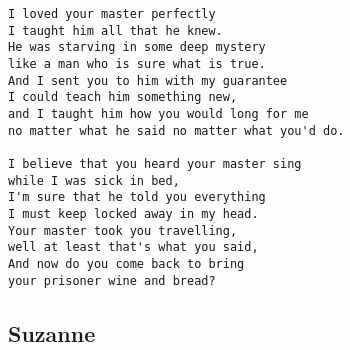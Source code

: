 \documentclass[a4paper]{article}
\begin{document}
\begin{Verbatim}[commandchars=\\\{\}]
I loved your master perfectly 
I taught him all that he knew. 
He was starving in some deep mystery 
like a man who is sure what is true. 
And I sent you to him with my guarantee 
I could teach him something new, 
and I taught him how you would long for me 
no matter what he said no matter what you'd do. 

I believe that you heard your master sing 
while I was sick in bed, 
I'm sure that he told you everything 
I must keep locked away in my head. 
Your master took you travelling, 
well at least that's what you said, 
And now do you come back to bring 
your prisoner wine and bread? 
\end{Verbatim}
\newpage
\subsection{Suzanne} %
\label{sub:Suzanne}
\end{document}

